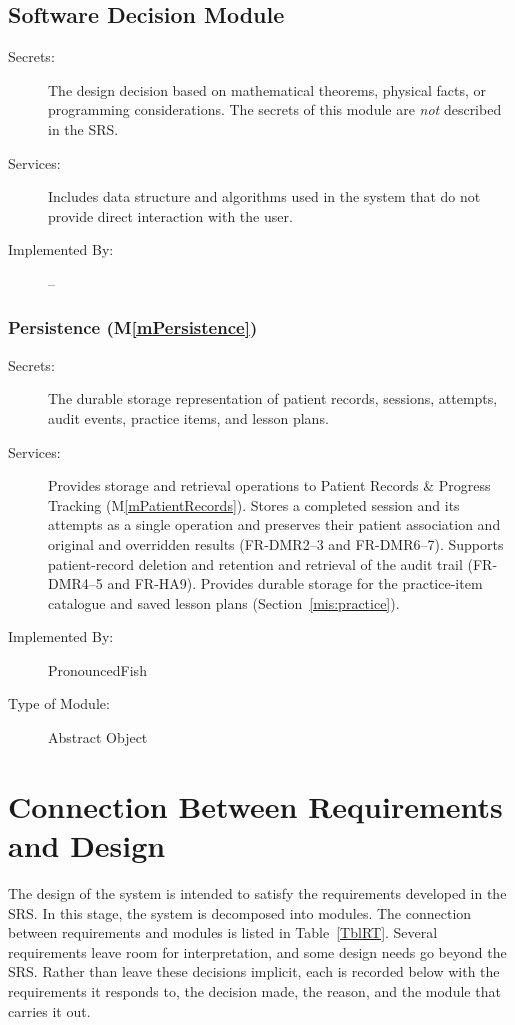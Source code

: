 \documentclass[12pt, titlepage]{article}
\newcommand{\mref}[1]{M\ref{#1}}
\begin{document}
\subsection{Software Decision Module}

\begin{description}
\item[Secrets:] The design decision based on mathematical theorems, physical
  facts, or programming considerations. The secrets of this module are
  \emph{not} described in the SRS.
\item[Services:] Includes data structure and algorithms used in the system that
  do not provide direct interaction with the user.
\item[Implemented By:] --
\end{description}

\subsubsection{Persistence (\mref{mPersistence})}

\begin{description}
\item[Secrets:] The durable storage representation of patient records,
sessions, attempts, audit events, practice items, and lesson plans.
\item[Services:] Provides storage and retrieval operations to Patient Records
\& Progress Tracking (\mref{mPatientRecords}). Stores a completed session
and its attempts as a single operation and preserves their patient association
and original and overridden results (FR-DMR2--3 and FR-DMR6--7). Supports
patient-record deletion and retention and retrieval of the audit trail
(FR-DMR4--5 and FR-HA9). Provides durable storage for the practice-item
catalogue and saved lesson plans (Section~\ref{mis:practice}).
\item[Implemented By:] PronouncedFish
\item[Type of Module:] Abstract Object
\end{description}

\section{Connection Between Requirements and Design} \label{SecConnection}

The design of the system is intended to satisfy the requirements developed in
the SRS. In this stage, the system is decomposed into modules. The connection
between requirements and modules is listed in Table~\ref{TblRT}. Several
requirements leave room for interpretation, and some design needs go beyond
the SRS. Rather than leave these decisions implicit, each is recorded below
with the requirements it responds to, the decision made, the reason, and the
module that carries it out.
\end{document}
